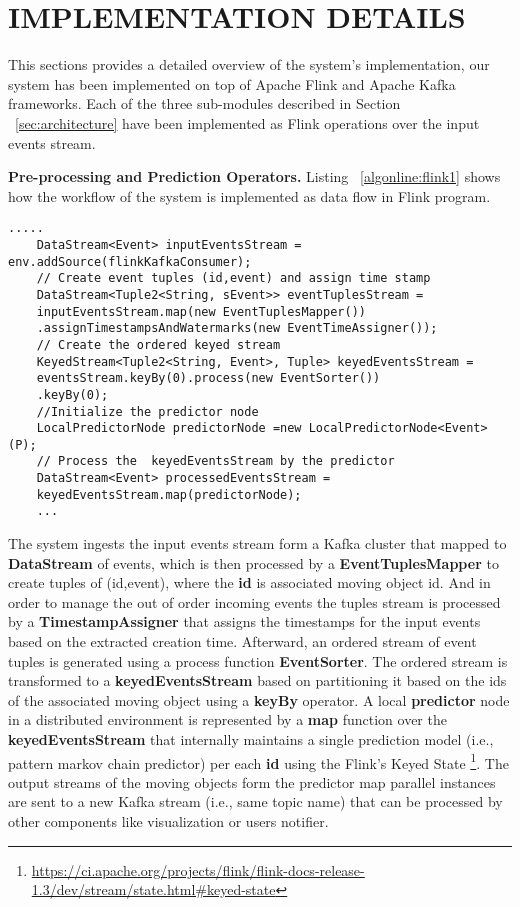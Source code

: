 

\section{IMPLEMENTATION DETAILS}
\label{sec:impl}
This sections provides a detailed overview of the system's implementation, our system has been implemented on top of Apache Flink and Apache Kafka frameworks. Each of the three sub-modules described in Section  ~\ref{sec:architecture} have been implemented as Flink operations over the input events stream. 

\textbf{Pre-processing and Prediction Operators.} Listing ~\ref{algonline:flink1} shows how the workflow of the system is implemented as data flow in Flink program.


	\begin{lstlisting}[caption={Flink pipeline for local predictors workflow},label={algonline:flink1},frame=single]
	.....
	DataStream<Event> inputEventsStream = env.addSource(flinkKafkaConsumer);	
	// Create event tuples (id,event) and assign time stamp 
	DataStream<Tuple2<String, sEvent>> eventTuplesStream =
	inputEventsStream.map(new EventTuplesMapper())
	.assignTimestampsAndWatermarks(new EventTimeAssigner());	
	// Create the ordered keyed stream 
	KeyedStream<Tuple2<String, Event>, Tuple> keyedEventsStream =
	eventsStream.keyBy(0).process(new EventSorter())
	.keyBy(0);	
	//Initialize the predictor node 
	LocalPredictorNode predictorNode =new LocalPredictorNode<Event>(P);
	// Process the  keyedEventsStream by the predictor 
	DataStream<Event> processedEventsStream =
	keyedEventsStream.map(predictorNode);
	...
	\end{lstlisting}
	
The system ingests the input events stream form a Kafka cluster that mapped to \textbf{DataStream} of events, which is then processed by a \textbf{EventTuplesMapper} to create tuples of (id,event), where the  \textbf{id} is associated moving object id. And in order to manage the out of order incoming events the tuples stream is processed by a \textbf{TimestampAssigner} that assigns the timestamps for the input events  based on the extracted creation time. Afterward,  an ordered stream of event tuples is generated using a process function \textbf{EventSorter}. The ordered stream is transformed to a \textbf{keyedEventsStream} based on partitioning it based on the ids of the associated moving object using a \textbf{keyBy} operator. A local \textbf{predictor} node in a distributed environment is represented by a \textbf{map} function over the \textbf{keyedEventsStream} that internally maintains a single prediction model (i.e., pattern markov chain predictor) per each \textbf{id} using the Flink's Keyed State \footnote{\url{https://ci.apache.org/projects/flink/flink-docs-release-1.3/dev/stream/state.html\#keyed-state}}. The output streams of the moving objects form the predictor map parallel instances are sent to a new Kafka stream (i.e., same topic name) that can be processed by other components like visualization or users notifier.


